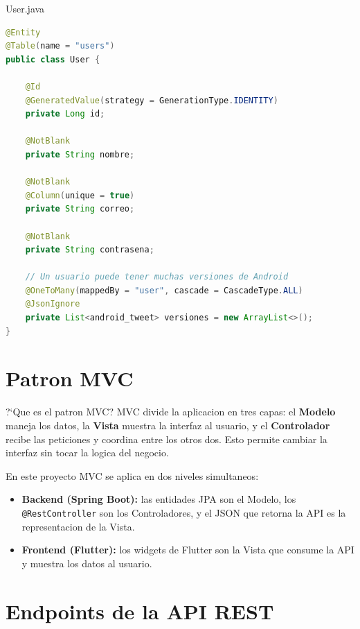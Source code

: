 \documentclass[12pt,a4paper]{article}
\begin{document}
\begin{filebox}{User.java}
\begin{lstlisting}[language=Java]
@Entity
@Table(name = "users")
public class User {

    @Id
    @GeneratedValue(strategy = GenerationType.IDENTITY)
    private Long id;

    @NotBlank
    private String nombre;

    @NotBlank
    @Column(unique = true)
    private String correo;

    @NotBlank
    private String contrasena;

    // Un usuario puede tener muchas versiones de Android
    @OneToMany(mappedBy = "user", cascade = CascadeType.ALL)
    @JsonIgnore
    private List<android_tweet> versiones = new ArrayList<>();
}
\end{lstlisting}
\end{filebox}

\section{Patron MVC}

\begin{patternbox}{?`Que es el patron MVC?}
MVC divide la aplicacion en tres capas: el \textbf{Modelo} maneja
los datos, la \textbf{Vista} muestra la interfaz al usuario, y el
\textbf{Controlador} recibe las peticiones y coordina entre los otros
dos. Esto permite cambiar la interfaz sin tocar la logica del negocio.
\end{patternbox}

En este proyecto MVC se aplica en dos niveles simultaneos:

\begin{itemize}
  \item \textbf{Backend (Spring Boot):} las entidades JPA son el Modelo,
        los \texttt{@RestController} son los Controladores, y el JSON
        que retorna la API es la representacion de la Vista.
  \item \textbf{Frontend (Flutter):} los widgets de Flutter son la Vista
        que consume la API y muestra los datos al usuario.
\end{itemize}

\section{Endpoints de la API REST}
\end{document}
